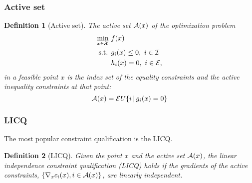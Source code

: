 \documentclass[usepdftitle=false]{beamer}
\newtheorem{defn}{Definition}
\begin{document}
\begin{frame}
\frametitle{Active set}

\begin{defn}[Active set]
The active set ${\mathcal{A}}(x)$ of the optimization problem
\begin{align*}
\min_{x \in {\mathcal{X}}} \ & f(x) \\
\mbox{s.t. } & g_i(x) \leq 0,\ i \in {\mathcal{I}} \\
& h_i(x) = 0,\ i \in {\mathcal{E}},
\end{align*}
in a feasible point $x$ is the index set of the equality constraints and the active inequality constraints at that point:
$$
{\mathcal{A}}(x) = {\mathcal{E}} U \{ i \,|\, g_i(x) = 0 \}
$$
\end{defn}

\end{frame}

\begin{frame}
\frametitle{LICQ}

The most popular constraint qualification is the LICQ.

\begin{defn}[LICQ]
Given the point $x$ and the active set ${\mathcal{A}}(x)$, the linear independence constraint qualification (LICQ) holds if the gradients of the active constraints, $\{\nabla_x c_i(x), i \in {\mathcal{A}}(x)\}$, are linearly independent.
\end{defn}

\end{frame}
\end{document}
